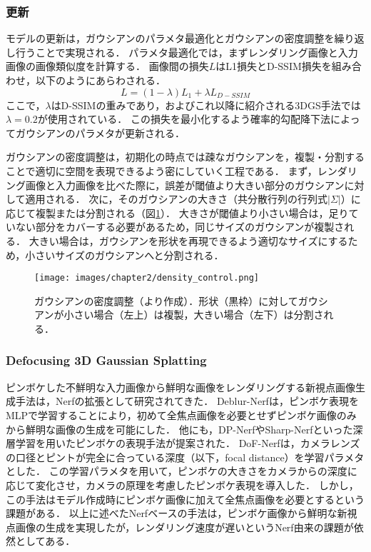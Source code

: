 \subsubsection*{更新}
モデルの更新は，ガウシアンのパラメタ最適化とガウシアンの密度調整を繰り返し行うことで実現される．
パラメタ最適化では，まずレンダリング画像と入力画像の画像類似度を計算する．
画像間の損失$L$はL1損失とD-SSIM損失\cite{d-ssim}を組み合わせ，以下のようにあらわされる．
\begin{equation}
  L = (1 - \lambda)L_1 + {\lambda}L_{D-SSIM}
\end{equation}
ここで，$\lambda$はD-SSIMの重みであり，\cite{3dgs}およびこれ以降に紹介される3DGS手法では$\lambda = 0.2$が使用されている．
この損失を最小化するよう確率的勾配降下法によってガウシアンのパラメタが更新される．\par

ガウシアンの密度調整は，初期化の時点では疎なガウシアンを，複製・分割することで適切に空間を表現できるよう密にしていく工程である．
まず，レンダリング画像と入力画像を比べた際に，誤差が閾値より大きい部分のガウシアンに対して適用される．
次に，そのガウシアンの大きさ（共分散行列の行列式$|\Sigma|$）に応じて複製または分割される（図\ref{fig:density_control}）．
大きさが閾値より小さい場合は，足りていない部分をカバーする必要があるため，同じサイズのガウシアンが複製される．
大きい場合は，ガウシアンを形状を再現できるよう適切なサイズにするため，小さいサイズのガウシアンへと分割される．

\begin{figure}[h]
    \centering
    \texttt{[image: images/chapter2/density\_control.png]}
    \caption[ガウシアンの密度調整]{ガウシアンの密度調整（\cite{3dgs}より作成）．形状（黒枠）に対してガウシアンが小さい場合（左上）は複製，大きい場合（左下）は分割される．}
    \label{fig:density_control}
\end{figure}

\subsubsection{Defocusing 3D Gaussian Splatting}\label{subsec:defocusing_3dgs}
ピンボケした不鮮明な入力画像から鮮明な画像をレンダリングする新視点画像生成手法は，Nerfの拡張として研究されてきた．
Deblur-Nerf\cite{deblur-nerf}は，ピンボケ表現をMLPで学習することにより，初めて全焦点画像を必要とせずピンボケ画像のみから鮮明な画像の生成を可能にした．
他にも，DP-Nerf\cite{dp-nerf}やSharp-Nerf\cite{sharp-nerf}といった深層学習を用いたピンボケの表現手法が提案された．
DoF-Nerf\cite{dof-nerf}は，カメラレンズの口径とピントが完全に合っている深度（以下，focal distance）を学習パラメタとした．
この学習パラメタを用いて，ピンボケの大きさをカメラからの深度に応じて変化させ，カメラの原理を考慮したピンボケ表現を導入した．
しかし，この手法はモデル作成時にピンボケ画像に加えて全焦点画像を必要とするという課題がある．
以上に述べたNerfベースの手法は，ピンボケ画像から鮮明な新視点画像の生成を実現したが，レンダリング速度が遅いというNerf由来の課題が依然としてある．\par

